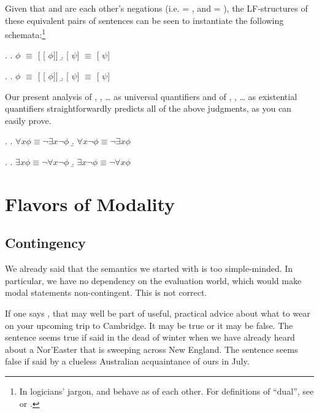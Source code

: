 Given that  and  are each other's negations
(i.e.  = , and  = ), the
LF-structures of these equivalent pairs of sentences can be seen to instantiate
the following schemata:\footnote{In logicians' jargon,  and
   behave as  of each other. For definitions of
  ``dual'', see \citet[197]{barwise-cooper:1981:generalized} or
  \citet[vol.2,238]{gamut:91}.}

\ex. \a.  $\phi$ $\equiv$  [ [ $\phi$]] \b.  [ \ensuremath{\psi}] $\equiv$  [ \ensuremath{\psi}]

\ex. \a.  $\phi$ $\equiv$  [ [ $\phi$]] \b.  [ \ensuremath{\psi}] $\equiv$  [ \ensuremath{\psi}]

Our present analysis of , , \dots{} as
universal quantifiers and of , , \dots{} as
existential quantifiers straightforwardly predicts all of the above judgments,
as you can easily prove.

\ex. \a. $\forall x \phi \equiv \neg \exists x \neg \phi$ \b. $\forall x \neg \phi \equiv \neg \exists x \phi$

\ex. \a. $\exists x \phi \equiv \neg \forall x \neg \phi$ \b. $\exists x \neg \phi \equiv \neg \forall x \phi$

\section{Flavors of Modality} \label{sec:flavors}

\subsection{Contingency} \label{sec:contingency}

We already said that the semantics we started with is too
simple-minded. In particular, we have no dependency on the evaluation
world, which would make modal statements non-contingent. This is not
correct.

If one says , that may well
be part of useful, practical advice about what to wear on your
upcoming trip to Cambridge. It may be true or it may be false. The
sentence seems true if said in the dead of winter when we have already
heard about a Nor'Easter that is sweeping across New England. The
sentence seems false if said by a clueless Australian acquaintance of
ours in July.


